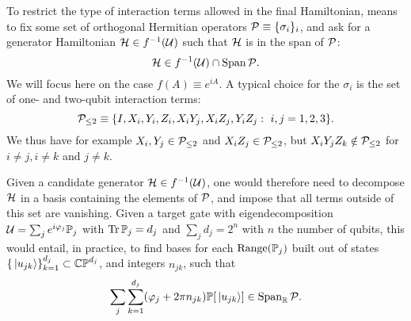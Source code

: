 To restrict the type of interaction terms allowed in the final Hamiltonian, means to fix some set of orthogonal Hermitian operators ${\mathcal{P}}\equiv\{\sigma_i\}_i$, and ask for a generator Hamiltonian ${\mathcal{H}}\in f^{-1}({\mathcal{U}})$ such that ${\mathcal{H}}$ is in the span of ${\mathcal{P}}$:
\begin{equation}
    {\mathcal{H}} \in f^{-1}({\mathcal{U}}) \cap \operatorname{Span}{\mathcal{P}}.
\end{equation}
We will focus here on the case  $f(A)\equiv e^{iA}$.
A typical choice for the $\sigma_i$ is the set of one- and two-qubit interaction terms:
\begin{equation}
    {\mathcal{P}}_{\le2} \equiv \{ I, X_i,Y_i,Z_i, X_i Y_j, X_i Z_j, Y_i Z_j : \,\,i,j=1,2,3 \}.
\end{equation}
We thus have for example $X_i,Y_j\in{\mathcal{P}}_{\le2}$ and $X_i Z_j\in{\mathcal{P}}_{\le2}$, but $X_i Y_j Z_k\notin{\mathcal{P}}_{\le2}$ for $i\neq j,i\neq k$ and $j\neq k$.

Given a candidate generator ${\mathcal{H}}\in f^{-1}({\mathcal{U}})$, one would therefore need to decompose ${\mathcal{H}}$ in a basis containing the elements of ${\mathcal{P}}$, and impose that all terms outside of this set are vanishing.
Given a target gate with eigendecomposition
${\mathcal{U}}=\sum_j e^{i\varphi_j}\mathbb{P}_j$ with $\Tr\mathbb{P}_j=d_j$ and $\sum_j d_j=2^n$ with $n$ the number of qubits, this would entail, in practice, to find bases for each $\operatorname{Range}(\mathbb{P}_j)$ built out of states $\{\ket*{u_{jk}}\}_{k=1}^{d_j}\subset \mathbb{CP}^{d_j}$, and integers $n_{jk}$, such that
\begin{equation}
    \sum_j\sum_{k=1}^{d_j} (\varphi_j + 2\pi n_{jk}) \mathbb{P}[\ket*{u_{jk}}]
    \in \operatorname{Span}_{\mathbb{R}}{\mathcal{P}}.
\end{equation}

